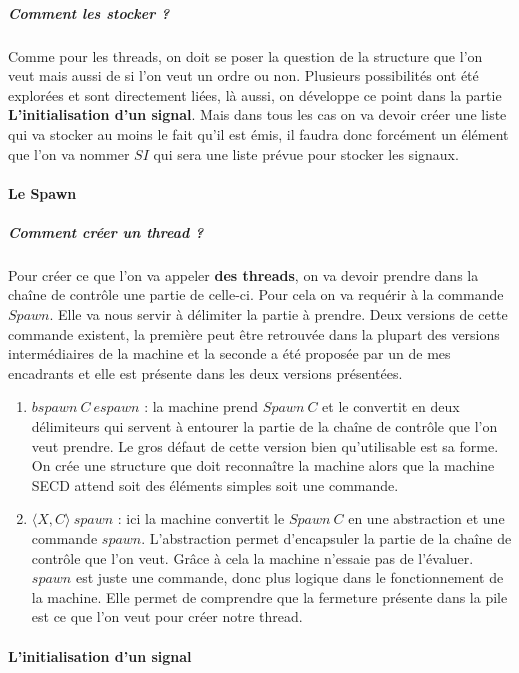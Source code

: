 \documentclass[10pt,a4paper]{report}
\begin{document}
	\subparagraph{Comment les stocker ?}
	Comme pour les threads, on doit se poser la question de la structure que l'on veut mais aussi de si l'on veut un ordre ou non. Plusieurs possibilités ont été explorées et sont directement liées, là aussi, on développe ce point dans la partie \textbf{L'initialisation d'un signal}. Mais dans tous les cas on va devoir créer une liste qui va stocker au moins le fait qu'il est émis, il faudra donc forcément un élément que l'on va nommer $SI$ qui sera une liste prévue pour stocker les signaux.
	\bigbreak 
	
	
	\paragraph{Le Spawn} 
	
	\subparagraph{Comment créer un thread ?}
	Pour créer ce que l'on va appeler \textbf{des threads}, on va devoir prendre dans la chaîne de contrôle une partie de celle-ci. Pour cela on va requérir à la commande $Spawn$. Elle va nous servir à délimiter la partie à prendre. Deux versions de cette commande existent, la première peut être retrouvée dans la plupart des versions intermédiaires de la machine et la seconde a été proposée par un de mes encadrants et elle est présente dans les deux versions présentées.
	\smallbreak
	\begin{enumerate}
		\item $bspawn~C~espawn$ : la machine prend $Spawn~C$ et le convertit en deux délimiteurs qui servent à entourer la partie de la chaîne de contrôle que l'on veut prendre. Le gros défaut de cette version bien qu'utilisable est sa forme. On crée une structure que doit reconnaître la machine alors que la machine SECD attend soit des éléments simples soit une commande.
		\item $\langle X,C\rangle~spawn$ : ici la machine convertit le $Spawn~C$ en une abstraction et une commande $spawn$. L'abstraction permet d'encapsuler la partie de la chaîne de contrôle que l'on veut. Grâce à cela la machine n'essaie pas de l'évaluer. $spawn$ est juste une commande, donc plus logique dans le fonctionnement de la machine. Elle permet de comprendre que la fermeture présente dans la pile est ce que l'on veut pour créer notre thread. 
	\end{enumerate}
	\newpage
	
	
	
	\paragraph{L'initialisation d'un signal}
	
\end{document}
